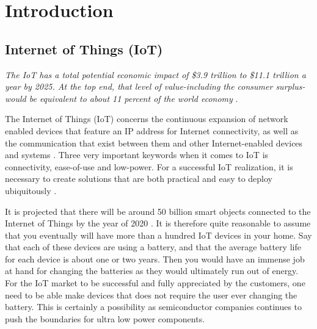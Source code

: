 \chapter{Introduction}

\section{Internet of Things (IoT)}

\textit{The IoT has a total potential economic impact of \$3.9 trillion to \$11.1 trillion a year by 2025. At the top end, that level of value-including the consumer surplus-would be equivalent to about 11 percent of the world economy} \cite{mckinsey15}.





The Internet of Things (IoT) concerns the continuous expansion of network enabled devices that feature an IP address for Internet connectivity, as well as the communication that exist between them and other Internet-enabled devices and systems \cite{webopedia}. Three very important keywords when it comes to IoT is connectivity, ease-of-use and low-power. For a successful IoT realization, it is necessary to create solutions that are both practical and easy to deploy ubiquitously \cite{embedded_IoT}. %


It is projected that there will be around 50 billion smart objects connected to the Internet of Things by the year of 2020 \cite{jayakumar14}. It is therefore quite reasonable to assume that you eventually will have more than a hundred IoT devices in your home. Say that each of these devices are using a battery, and that the average battery life for each device is about one or two years. Then you would have an immense job at hand for changing the batteries as they would ultimately run out of energy. For the IoT market to be successful and fully appreciated by the customers, one need to be able make devices that does not require the user ever changing the battery. This is certainly a possibility as semiconductor companies continues to push the boundaries for ultra low power components.  

